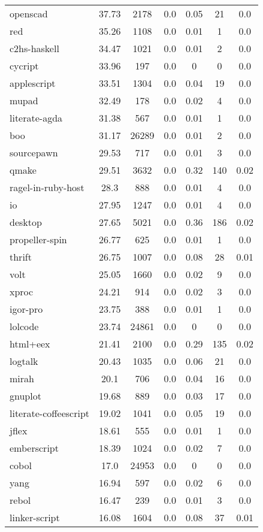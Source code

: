 \begin{longtable}{l|ccc|ccc}
openscad & 37.73 & 2178 & 0.0 & 0.05 & 21 & 0.0 \\
red & 35.26 & 1108 & 0.0 & 0.01 & 1 & 0.0 \\
c2hs-haskell & 34.47 & 1021 & 0.0 & 0.01 & 2 & 0.0 \\
cycript & 33.96 & 197 & 0.0 & 0 & 0 & 0.0 \\
applescript & 33.51 & 1304 & 0.0 & 0.04 & 19 & 0.0 \\
mupad & 32.49 & 178 & 0.0 & 0.02 & 4 & 0.0 \\
literate-agda & 31.38 & 567 & 0.0 & 0.01 & 1 & 0.0 \\
boo & 31.17 & 26289 & 0.0 & 0.01 & 2 & 0.0 \\
sourcepawn & 29.53 & 717 & 0.0 & 0.01 & 3 & 0.0 \\
qmake & 29.51 & 3632 & 0.0 & 0.32 & 140 & 0.02 \\
ragel-in-ruby-host & 28.3 & 888 & 0.0 & 0.01 & 4 & 0.0 \\
io & 27.95 & 1247 & 0.0 & 0.01 & 4 & 0.0 \\
desktop & 27.65 & 5021 & 0.0 & 0.36 & 186 & 0.02 \\
propeller-spin & 26.77 & 625 & 0.0 & 0.01 & 1 & 0.0 \\
thrift & 26.75 & 1007 & 0.0 & 0.08 & 28 & 0.01 \\
volt & 25.05 & 1660 & 0.0 & 0.02 & 9 & 0.0 \\
xproc & 24.21 & 914 & 0.0 & 0.02 & 3 & 0.0 \\
igor-pro & 23.75 & 388 & 0.0 & 0.01 & 1 & 0.0 \\
lolcode & 23.74 & 24861 & 0.0 & 0 & 0 & 0.0 \\
html+eex & 21.41 & 2100 & 0.0 & 0.29 & 135 & 0.02 \\
logtalk & 20.43 & 1035 & 0.0 & 0.06 & 21 & 0.0 \\
mirah & 20.1 & 706 & 0.0 & 0.04 & 16 & 0.0 \\
gnuplot & 19.68 & 889 & 0.0 & 0.03 & 17 & 0.0 \\
literate-coffeescript & 19.02 & 1041 & 0.0 & 0.05 & 19 & 0.0 \\
jflex & 18.61 & 555 & 0.0 & 0.01 & 1 & 0.0 \\
emberscript & 18.39 & 1024 & 0.0 & 0.02 & 7 & 0.0 \\
cobol & 17.0 & 24953 & 0.0 & 0 & 0 & 0.0 \\
yang & 16.94 & 597 & 0.0 & 0.02 & 6 & 0.0 \\
rebol & 16.47 & 239 & 0.0 & 0.01 & 3 & 0.0 \\
linker-script & 16.08 & 1604 & 0.0 & 0.08 & 37 & 0.01 \\

\end{longtable}
